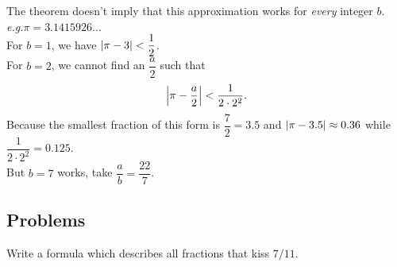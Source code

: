 \vspace*{1em}

\begin{remark}
The theorem doesn't imply that this approximation works for \emph{every} integer $b$.\\[0.5em]
\emph{e.g.}\quad $\pi = 3.1415926\ldots$\\[0.5em]
For $b = 1$, we have $\left\lvert\pi - 3\right\rvert < \dfrac{1}{2}$.\\[1em]
For $b = 2$, we cannot find an $\dfrac{a}{2}$ such that \[\left\lvert\pi - \dfrac{a}{2}\right\rvert<\dfrac{1}{2\cdot 2^2}.\] Because the smallest fraction of this form is $\dfrac{7}{2} = 3.5$ and $\left\lvert\pi - 3.5\right\rvert \approx 0.36$ while $\dfrac{1}{2\cdot 2^2} = 0.125$.\\[1em]
But $b = 7$ works, take $\dfrac{a}{b} = \dfrac{22}{7}$.
\end{remark}


\subsection{Problems}
\vspace{0.1in}

\begin{problem}\label{Problem 7.1}
Write a formula which describes all fractions that kiss $7/11$.
\end{problem}